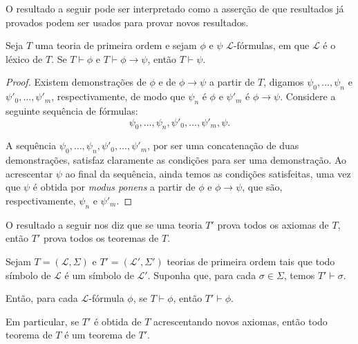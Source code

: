 O resultado a seguir pode ser interpretado como a asserção de que resultados já provados podem ser usados para provar novos resultados.
\begin{metalemma}\label{mlem:modusPonens}
    Seja $T$ uma teoria de primeira ordem e sejam $\phi$ e $\psi$ $\mathcal L$-fórmulas, em que $\mathcal L$ é o léxico de $T$.
    Se $T \vdash \phi$ e $T \vdash \phi \rightarrow \psi$, então $T \vdash \psi$.
\end{metalemma}
\begin{proof}
    Existem demonstrações de $\phi$ e de $\phi \rightarrow \psi$ a partir de $T$, digamos $\psi_0, \dots, \psi_n$ e $\psi'_0, \dots, \psi'_m$, respectivamente, de modo que $\psi_n$ é $\phi$ e $\psi'_m$ é $\phi \rightarrow \psi$.
    Considere a seguinte sequência de fórmulas:
    \begin{equation*}
        \psi_0, \dots, \psi_n, \psi'_0, \dots, \psi'_{m}, \psi.
    \end{equation*}

    A sequência $\psi_0, \dots, \psi_n, \psi'_0, \dots, \psi'_{m}$, por ser uma concatenação de duas demonstrações, satisfaz claramente as condições para ser uma demonstração.
    Ao acrescentar $\psi$ ao final da sequência, ainda temos as condições satisfeitas, uma vez que $\psi$ é obtida por \emph{modus ponens} a partir de $\phi$ e $\phi \rightarrow \psi$, que são, respectivamente, $\psi_n$ e $\psi'_m$.
\end{proof}

O resultado a seguir nos diz que se uma teoria $T'$ prova todos os axiomas de $T$, então $T'$ prova todos os teoremas de $T$.

\begin{metaproposition}\label{mprop:extensaoDeTeoria}
    Sejam $T=(\mathcal L,\Sigma)$ e $T'=(\mathcal L',\Sigma')$ teorias de primeira ordem tais que todo símbolo de $\mathcal L$ é um símbolo de $\mathcal L'$.
    Suponha que, para cada $\sigma\in\Sigma$, temos $T'\vdash \sigma$.

    Então, para cada $\mathcal L$-fórmula $\phi$, se $T\vdash \phi$, então $T'\vdash \phi$.

    Em particular, se $T'$ é obtida de $T$ acrescentando novos axiomas, então todo teorema de $T$ é um teorema de $T'$.
\end{metaproposition}

